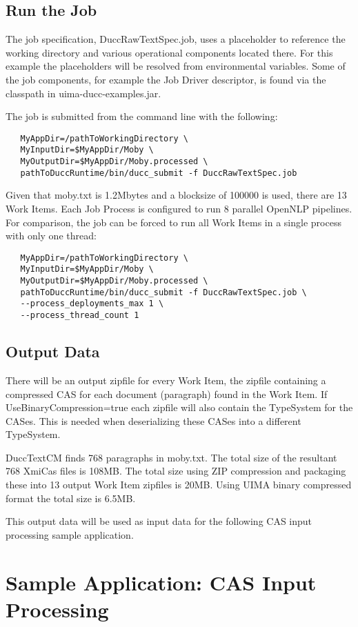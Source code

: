 \section{Run the Job}
The job specification, DuccRawTextSpec.job, uses a placeholder to reference the working directory
and various operational components located there. For this example the placeholders will be resolved
from environmental variables. Some of the job components, for example
the Job Driver descriptor, is found via the classpath in uima-ducc-examples.jar.

The job is submitted from the command line with the following:
\begin{verbatim}
   MyAppDir=/pathToWorkingDirectory \
   MyInputDir=$MyAppDir/Moby \
   MyOutputDir=$MyAppDir/Moby.processed \
   pathToDuccRuntime/bin/ducc_submit -f DuccRawTextSpec.job
\end{verbatim}

Given that moby.txt is 1.2Mbytes and a blocksize of 100000 is used, there are 13 Work Items. Each Job Process is configured to run 8 parallel OpenNLP pipelines. For comparison, the job can be forced to run all Work Items in a single process with only one thread:
\begin{verbatim}
   MyAppDir=/pathToWorkingDirectory \
   MyInputDir=$MyAppDir/Moby \
   MyOutputDir=$MyAppDir/Moby.processed \
   pathToDuccRuntime/bin/ducc_submit -f DuccRawTextSpec.job \
   --process_deployments_max 1 \
   --process_thread_count 1
\end{verbatim}

\section{Output Data}
There will be an output zipfile for every Work Item, the zipfile containing a compressed CAS for each document (paragraph) 
found in the Work Item. If UseBinaryCompression=true each zipfile will also contain the TypeSystem for the CASes. 
This is needed when deserializing these CASes into a different TypeSystem.

DuccTextCM finds 768 paragraphs in moby.txt. The total size of the resultant 768 XmiCas files is 108MB. The total size using ZIP compression and packaging these into 13 output Work Item zipfiles is 20MB. Using UIMA binary compressed format the total size is 6.5MB.

This output data will be used as input data for the following CAS input processing sample application.


\chapter{Sample Application: CAS Input Processing}

